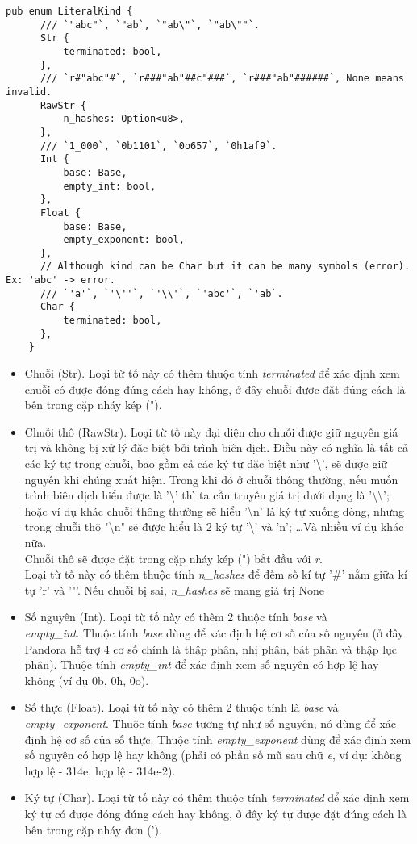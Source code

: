 \begin{itemize}
    \begin{lstlisting}[]
    pub enum LiteralKind {
      /// `"abc"`, `"ab`, `"ab\"`, `"ab\""`.
      Str {
          terminated: bool,
      },
      /// `r#"abc"#`, `r###"ab"##c"###`, `r###"ab"######`, None means invalid.
      RawStr {
          n_hashes: Option<u8>,
      },
      /// `1_000`, `0b1101`, `0o657`, `0h1af9`.
      Int {
          base: Base,
          empty_int: bool,
      },
      Float {
          base: Base,
          empty_exponent: bool,
      },
      // Although kind can be Char but it can be many symbols (error). Ex: 'abc' -> error.
      /// `'a'`, `'\''`, `'\\'`, `'abc'`, `'ab`.
      Char {
          terminated: bool,
      },
    }
    \end{lstlisting}
    \begin{itemize}
      \item Chuỗi (Str). Loại từ tố này có thêm thuộc tính \textit{terminated} để xác định xem chuỗi có được đóng đúng cách hay không, ở đây chuỗi được đặt đúng cách là bên trong cặp nháy kép (").
      \item Chuỗi thô (RawStr). Loại từ tố này đại diện cho chuỗi được giữ nguyên giá trị và không bị xử lý đặc biệt bởi trình biên dịch. Điều này có nghĩa là tất cả các ký tự trong chuỗi, bao gồm cả các ký tự đặc biệt như '\textbackslash', sẽ được giữ nguyên khi chúng xuất hiện. Trong khi đó ở chuỗi thông thường, nếu muốn trình biên dịch hiểu được là '\textbackslash' thì ta cần truyền giá trị dưới dạng là '\textbackslash\textbackslash'; hoặc ví dụ khác chuỗi thông thường sẽ hiểu '\textbackslash n' là ký tự xuống dòng, nhưng trong chuỗi thô "\textbackslash n" sẽ được hiểu là 2 ký tự '\textbackslash' và 'n'; \dots\space Và nhiều ví dụ khác nữa. 
      \\Chuỗi thô sẽ được đặt trong cặp nháy kép (") bắt đầu với \textit{r}.
      \\Loại từ tố này có thêm thuộc tính \textit{n\_hashes} để đếm số kí tự '\#' nằm giữa kí tự 'r' và '"'. Nếu chuỗi bị sai, \textit{n\_hashes} sẽ mang giá trị None
      \item Số nguyên (Int). Loại từ tố này có thêm 2 thuộc tính \textit{base} và \\\textit{empty\_int}. Thuộc tính \textit{base} dùng để xác định hệ cơ số của số nguyên (ở đây Pandora hỗ trợ 4 cơ số chính là thập phân, nhị phân, bát phân và thập lục phân). Thuộc tính \textit{empty\_int} để xác định xem số nguyên có hợp lệ hay không (ví dụ 0b, 0h, 0o).
      \item Số thực (Float). Loại từ tố này có thêm 2 thuộc tính là \textit{base} và \\\textit{empty\_exponent}. Thuộc tính \textit{base} tương tự như số nguyên, nó dùng để xác định hệ cơ số của số thực. Thuộc tính \textit{empty\_exponent} dùng để xác định xem số nguyên có hợp lệ hay không (phải có phần số mũ sau chữ \textit{e}, ví dụ: không hợp lệ - 314e, hợp lệ - 314e-2).
      \item Ký tự (Char). Loại từ tố này có thêm thuộc tính \textit{terminated} để xác định xem ký tự có được đóng đúng cách hay không, ở đây ký tự được đặt đúng cách là bên trong cặp nháy đơn (').
      

\end{itemize}
\end{itemize}
